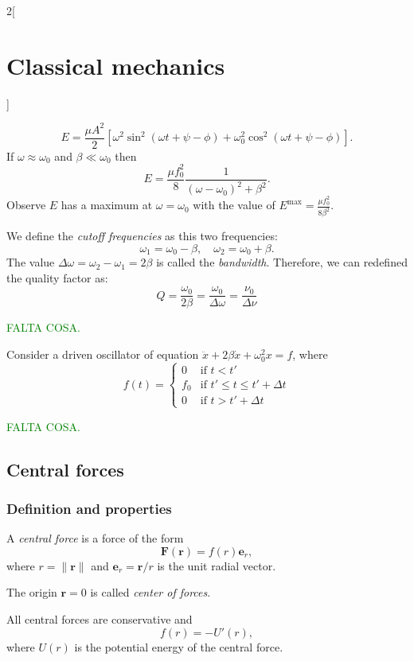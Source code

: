 \documentclass[../../../main.tex]{subfiles}
\begin{document}
\begin{multicols}{2}[\section{Classical mechanics}]
\begin{prop}
    \end{prop}
    \begin{prop}
        $$E=\frac{\mu A^2}{2}\left[\omega^2\sin^2(\omega t+\psi-\phi)+\omega_0^2\cos^2(\omega t+\psi-\phi)\right].$$ If $\omega\approx\omega_0$ and $\beta\ll\omega_0$ then $$E=\frac{\mu f_0^2}{8}\frac{1}{(\omega-\omega_0)^2+\beta^2}.$$ Observe $E$ has a maximum at $\omega=\omega_0$ with the value of $E^\text{max}=\frac{\mu f_0^2}{8\beta^2}$.
    \end{prop}
    \begin{definition}
        We define the \textit{cutoff frequencies} as this two frequencies: $$\omega_1=\omega_0-\beta,\quad\omega_2=\omega_0+\beta.$$ The value  $\Delta\omega=\omega_2-\omega_1=2\beta$ is called the \textit{bandwidth}. Therefore, we can redefined the quality factor as: $$Q=\frac{\omega_0}{2\beta}=\frac{\omega_0}{\Delta\omega}=\frac{\nu_0}{\Delta\nu}$$
    \end{definition}
    \textcolor{green}{FALTA COSA.}
    \begin{prop}
        Consider a driven oscillator of equation $\ddot{x}+2\beta\dot{x}+\omega_0^2x=f$, where $$f(t)=\left\{
            \begin{array}{cc}
                0   & \text{if } t<t'                    \\
                f_0 & \text{if }t'\leq t\leq t'+\Delta t \\
                0   & \text{if } t>t'+\Delta t
            \end{array}\right.$$
    \end{prop}
    \textcolor{green}{FALTA COSA.}
    \subsection{Central forces}
    \subsubsection*{Definition and properties}
    \begin{definition}
        A \textit{central force} is a force of the form $$\boldsymbol{F}(\boldsymbol{r})=f(r)\boldsymbol{e}_r,$$ where $r=\|\boldsymbol{r}\|$ and $\boldsymbol{e}_r=\boldsymbol{r}/r$ is the unit radial vector.
    \end{definition}
    \begin{definition}
        The origin $\boldsymbol{r}=0$ is called \textit{center of forces}.
    \end{definition}
    \begin{prop}
        All central forces are conservative and $$f(r)=-U'(r),$$ where $U(r)$ is the potential energy of the central force.
    \end{prop}

\end{multicols}
\end{document}
